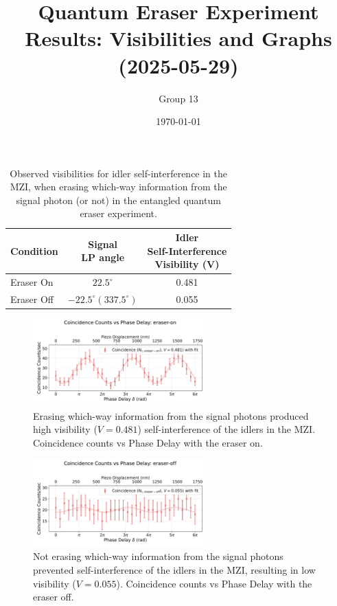\documentclass{article}
\title{Quantum Eraser Experiment Results: Visibilities and Graphs (2025-05-29)}
\author{Group 13} %
\date{\today}
\begin{document}
\pagestyle{empty} %

%

\begin{table}[h!]
\centering
\begin{tabular}{lcc}
\toprule
Condition & \makecell{Signal \\ LP angle} & \makecell{Idler \\ Self-Interference \\ Visibility (V)} \\
\midrule
Eraser On          & $22.5^\circ$  & 0.481 \\
Eraser Off         & $-22.5^\circ (337.5^\circ)$ & 0.055 \\
\bottomrule
\end{tabular}
\caption{
  Observed visibilities for idler self-interference in the MZI,
  when erasing which-way information from the signal photon (or not)
  in the entangled quantum eraser experiment.}
\end{table}


\begin{figure}[h!]
\centering
\includegraphics[width=0.6\textwidth]{coincidence_counts_eraser_on.pdf}
\caption{
  Erasing which-way information from the signal photons
  produced high visibility ($V=0.481$) self-interference of the idlers in the MZI.
  Coincidence counts vs Phase Delay with the eraser on.
}
\end{figure}


\begin{figure}[h!]
\centering
\includegraphics[width=0.6\textwidth]{coincidence_counts_eraser_off.pdf}
\caption{
  Not erasing which-way information from the signal photons
  prevented self-interference of the idlers in the MZI,
  resulting in low visibility ($V=0.055$).
  Coincidence counts vs Phase Delay with the eraser off.
}
\end{figure}
\end{document}
